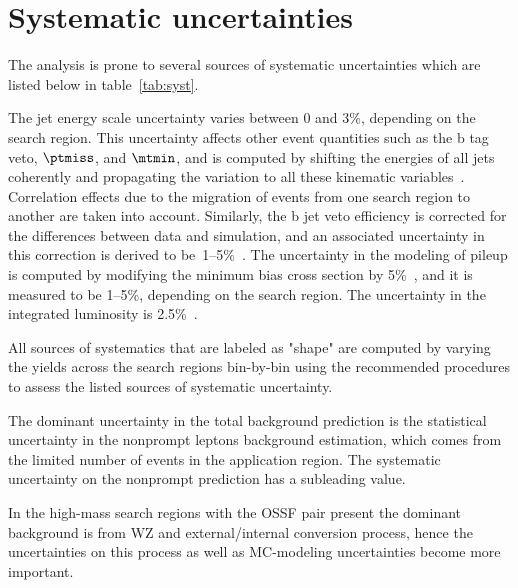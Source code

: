 \clearpage
\section{Systematic uncertainties}
The analysis is prone to several sources of systematic uncertainties which are listed below in table~\ref{tab:syst}. 

The jet energy scale uncertainty varies between 0 and 3\%, depending on the search region. 
This uncertainty affects other event quantities such as the b tag veto, $\ptmiss$, and $\mtmin$, 
and is computed by shifting the energies of all jets coherently and propagating the variation to all these kinematic variables~\cite{jecDataMC}. 
Correlation effects due to the migration of events from one search region to another are taken into account. 
Similarly, the b jet veto efficiency is corrected for the differences between data and simulation, 
and an associated uncertainty in this correction is derived to be~1--5\%~\cite{btagSF}. 
The uncertainty in the modeling of pileup is computed by modifying the minimum bias cross section by 5\%~\cite{PUtwiki},
and it is measured to be 1--5\%, depending on the search region. 
The uncertainty in the integrated luminosity is 2.5\%~\cite{CMS-PAS-LUM-17-001}.

All sources of systematics that are labeled as "shape" are computed by varying the yields across the search regions 
bin-by-bin using the recommended procedures to assess the listed sources of systematic uncertainty.  

The dominant uncertainty in the total background prediction is the statistical uncertainty in the nonprompt leptons background estimation,
which comes from the limited number of events in the application region. The systematic uncertainty on the nonprompt prediction has
a subleading value. 

In the high-mass search regions with the OSSF pair present the dominant background is from WZ and external/internal conversion process, hence
the uncertainties on this process as well as MC-modeling uncertainties become more important.

